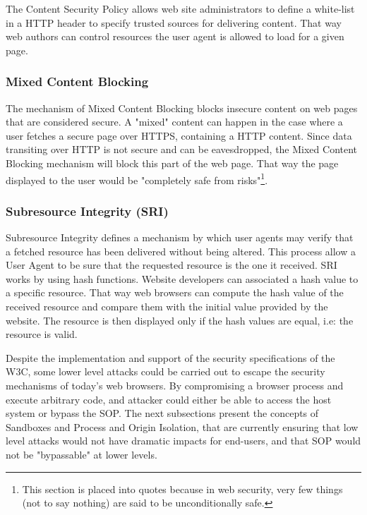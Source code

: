 \documentclass[journal]{IEEEtran}
\begin{document}
The Content Security Policy allows web site administrators to define a white-list in a HTTP header to specify trusted sources for delivering content. That way web authors can control resources the user agent is allowed to load for a given page.

\subsubsection{Mixed Content Blocking}

The mechanism of Mixed Content Blocking blocks insecure content on web pages that are considered secure. A "mixed" content can happen in the case where a user fetches a secure page over HTTPS, containing a HTTP content. Since data transiting over HTTP is not secure and can be eavesdropped, the Mixed Content Blocking mechanism will block this part of the web page. That way the page displayed to the user would be "completely safe from risks"\footnote{This section is placed into quotes because in web security, very few things (not to say nothing) are said to be unconditionally safe.}.

\subsubsection{Subresource Integrity (SRI)}

Subresource Integrity defines a mechanism by which user agents may verify that a fetched resource has been delivered without being altered. This process allow a User Agent to be sure that the requested resource is the one it received. SRI works by using hash functions. Website developers can associated a hash value to a specific resource. That way web browsers can compute the hash value of the received resource and compare them with the initial value provided by the website. The resource is then displayed only if the hash values are equal, i.e: the resource is valid. 

\medskip
\medskip

Despite the implementation and support of the security specifications of the W3C, some lower level attacks could be carried out to escape the security mechanisms of today's web browsers. By compromising a browser process and execute arbitrary code, and attacker could either be able to access the host system or bypass the SOP. The next subsections present the concepts of Sandboxes and Process and Origin Isolation, that are currently ensuring that low level attacks would not have dramatic impacts for end-users, and that SOP would not be "bypassable" at lower levels.
\end{document}
